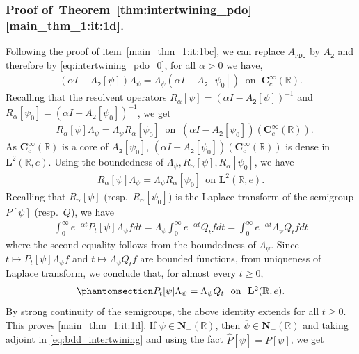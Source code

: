 \documentclass[12pt]{amsart}
\newcommand{\hlabel}{\phantomsection\label}
\newcommand{\hptg}[2]{\hypertarget{#1}{#2}}
\numberwithin{equation}{section}
\newcommand{\bb}{\mathbb}
\renewcommand{\ge}{\geqslant}
\renewcommand{\geq}{\geqslant}
\newcommand{\ov}{\overline}
\newcommand{\ttt}{\mathtt}
\newcommand{\bmrm}[2][2]{\mathbf{#2}^{#1}}
\newcommand{\C}{\mathbf{C}}
\theoremstyle{definition}
\theoremstyle{assump}
\theoremstyle{remark}
\begin{document}
{\subsubsection{Proof of~Theorem~\ref{thm:intertwining_pdo}\eqref{main_thm_1:it:1d}.} Following the proof of item~\eqref{main_thm_1:it:1bc}, we can replace $A_\ttt{PDO}$ by $A_\ttt{2}$ and therefore by \eqref{eq:intertwining_pdo_0}, for all $\alpha>0$ we have,
\begin{align*}
(\alpha I-A_\ttt{2}[\psi])\Lambda_\psi  =\Lambda_\psi(\alpha I-A_\ttt{2}[\psi_0]) \ \textrm{ on } \  \C^\infty_c(\bb{R}).
\end{align*}
Recalling that the resolvent operators $R_\alpha[\psi]=(\alpha I-A_\ttt{2}[\psi])^{-1}$ and $R_\alpha[\psi_0]=(\alpha I-A_\ttt{2}[\psi_0])^{-1}$, we get
\begin{align*}
&R_\alpha[\psi]\Lambda_\psi =\Lambda_\psi R_\alpha[\psi_0]  \ \mbox{ on } \ (\alpha I-A_\ttt{2}[\psi_0])(\C^\infty_c(\bb{R})).\nonumber
\end{align*}
As $\C^\infty_c(\bb{R})$ is a core of $A_\ttt{2}[\psi_0]$, $(\alpha I-A_\ttt{2}[\psi_0])(\C^\infty_c(\bb{R}))$ is dense in $\bmrm{L}(\bb{R},e)$. Using the boundedness of $\Lambda_\psi, R_\alpha[\psi], R_\alpha[\psi_0]$, we have
\begin{align*}
R_\alpha[\psi]\Lambda_\psi=\Lambda_\psi R_\alpha[\psi_0] \ \ \mbox{on \ $\bmrm{L}(\bb{R},e)$}.
\end{align*}
Recalling  that $R_\alpha[\psi]$ (resp.~$R_\alpha[\psi_0]$) is the Laplace transform of the semigroup $P[\psi]$ (resp.~$Q$), we have
\begin{equation*}
\begin{aligned}
\int_0^\infty e^{-\alpha t}P_t[\psi]\Lambda_\psi f dt=\Lambda_\psi \int_0^\infty e^{-\alpha t} Q_t f dt=\int_0^\infty e^{-\alpha t} \Lambda_\psi Q_t f dt
\end{aligned}
\end{equation*}
where the second equality follows from the boundedness of $\Lambda_\psi$. Since $t\mapsto P_t[\psi]\Lambda_\psi f$ and $t\mapsto \Lambda_\psi Q_t f$ are bounded functions, from uniqueness of Laplace transform, we conclude that, for almost every $t\geq 0$,
\begin{align}\hlabel{eq:gen_semigroup_intertwining}
P_t[\psi]\Lambda_\psi=\Lambda_\psi Q_t \ \ \mbox{on \ $\bmrm{L}(\bb{R},e)$.}
\end{align}
\hptg{C49}{By strong continuity of the semigroups, the above identity extends for all $t\ge 0$.} This proves \eqref{main_thm_1:it:1d}. If $\psi\in\mathbf{N}_-(\bb{R})$, then $\ov{\psi}\in\mathbf{N}_+(\bb{R})$ and taking adjoint in \eqref{eq:bdd_intertwining} and using the fact $\widehat{P}[\ov{\psi}]=P[\psi]$, we get
}
\end{document}
